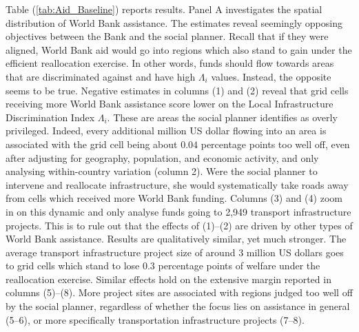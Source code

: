 \documentclass[11pt, oneside]{article}   	%
\let\oldref\ref
\renewcommand{\ref}[1]{(\oldref{#1})}
\begin{document}
Table \ref{tab:Aid_Baseline} reports results. Panel A investigates the spatial distribution of World Bank assistance. The estimates reveal seemingly opposing objectives between the Bank and the social planner. Recall that if they were aligned, World Bank aid would go into regions which also stand to gain under the efficient reallocation exercise. In other words, funds should flow towards areas that are discriminated against and have high $\Lambda_{i}$ values. Instead, the opposite seems to be true. Negative estimates in columns (1) and (2) reveal that grid cells receiving more World Bank assistance score lower on the Local Infrastructure Discrimination Index $\Lambda_{i}$. These are areas the social planner identifies as overly privileged. Indeed, every additional million US dollar flowing into an area is associated with the grid cell being about $0.04$ percentage points too well off, even after adjusting for geography, population, and economic activity, and only analysing within-country variation (column 2). Were the social planner to intervene and reallocate infrastructure, she would systematically take roads away from cells which received more World Bank funding. Columns (3) and (4) zoom in on this dynamic and only analyse funds going to 2,949 transport infrastructure projects. This is to rule out that the effects of (1)--(2) are driven by other types of World Bank assistance. Results are qualitatively similar, yet much stronger. The average transport infrastructure project size of around 3 million US dollars goes to grid cells which stand to lose $0.3$ percentage points of welfare under the reallocation exercise. Similar effects hold on the extensive margin reported in columns (5)--(8). More project sites are associated with regions judged too well off by the social planner, regardless of whether the focus lies on assistance in general (5--6), or more specifically transportation infrastructure projects (7--8).
\end{document}
